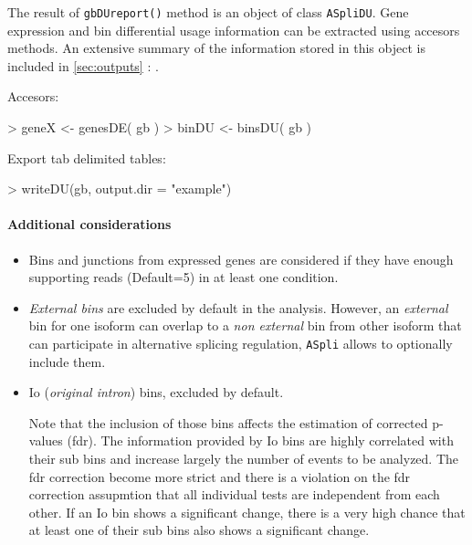 \documentclass{article}
\newcommand{\secref}[1]{\ref{#1} : \nameref{#1}}
\begin{document}
The result of \texttt{gbDUreport()} method is an object of class 
\texttt{ASpliDU}. Gene expression and bin differential usage information can be extracted using accesors methods. An extensive summary of the information stored in this object is included in \secref{sec:outputs}.

Accesors:

\begin{Schunk}
\begin{Sinput}
> geneX  <- genesDE( gb )
> binDU  <- binsDU( gb )
\end{Sinput}
\end{Schunk}

Export tab delimited tables:

\begin{Schunk}
\begin{Sinput}
> writeDU(gb, output.dir = "example")
\end{Sinput}
\end{Schunk}

\paragraph{Additional considerations}

\begin{itemize}
\item Bins and junctions from expressed genes are considered if they have enough supporting reads (Default=5) in at least one condition. 

\item {\em External bins} are excluded by default in the analysis. 
However, an {\em external} bin for one isoform can overlap to a {\em non external} bin from other isoform that can participate in alternative splicing regulation, \texttt{ASpli} allows to optionally include them. 
\item Io ({\em original intron}) bins, excluded by default.

Note that the inclusion of those bins affects the estimation of corrected p-values (fdr). The information provided by Io bins are highly correlated with their sub bins and increase largely the number of events to be analyzed. The fdr correction become more strict and there is a violation on the fdr correction assupmtion that all individual tests are independent from each other. If an Io bin shows a significant change, there is a very high chance that at least one of their sub bins also shows a significant change. 
\end{itemize}
\end{document}
